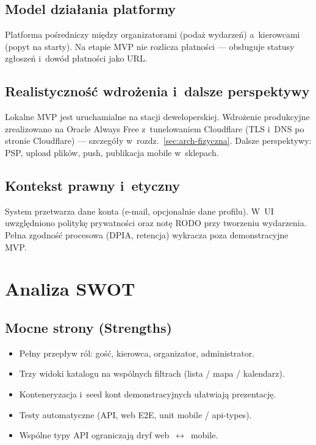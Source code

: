 \documentclass{sprz}
\begin{document}
\section{Model działania platformy}  
Platforma pośredniczy między organizatorami (podaż wydarzeń) a~kierowcami (popyt na starty). Na etapie MVP nie rozlicza płatności --- obsługuje statusy zgłoszeń i~dowód płatności jako URL.  
  
\section{Realistyczność wdrożenia i~dalsze perspektywy}  
Lokalne MVP jest uruchamialne na stacji deweloperskiej. Wdrożenie produkcyjne zrealizowano na Oracle Always Free z~tunelowaniem Cloudflare (TLS i~DNS po stronie Cloudflare) --- szczegóły w~rozdz.~\ref{sec:arch-fizyczna}. Dalsze perspektywy: PSP, upload plików, push, publikacja mobile w~sklepach.  
  
\section{Kontekst prawny i~etyczny}  
System przetwarza dane konta (e-mail, opcjonalnie dane profilu). W~UI uwzględniono politykę prywatności oraz notę RODO przy tworzeniu wydarzenia. Pełna zgodność procesowa (DPIA, retencja) wykracza poza demonstracyjne MVP.  
  
\chapter{Analiza SWOT}  
\section{Mocne strony (Strengths)}  
\begin{itemize}  
 \item Pełny przepływ ról: gość, kierowca, organizator, administrator.  
 \item Trzy widoki katalogu na wspólnych filtrach (lista / mapa / kalendarz).  
 \item Konteneryzacja i~seed kont demonstracyjnych ułatwiają prezentację.  
 \item Testy automatyczne (API, web E2E, unit mobile / api-types).  
 \item Wspólne typy API ograniczają dryf web~$\leftrightarrow$~mobile.  
\end{itemize}  
  
\end{document}
